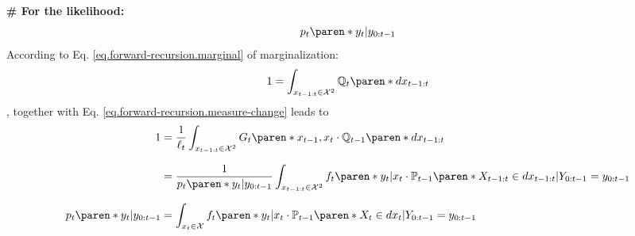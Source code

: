 \textbf{\# For the likelihood:} \label{appendix.sec.bootstrap-likelihood}
%
\begin{equation*}
    p_{t} \paren*{y_{t} \vert y_{0:t-1}}
\end{equation*}
%
According to Eq. \eqref{eq.forward-recursion.marginal} of marginalization:
%
\begin{equation*}
    1 = \int_{x_{t-1:t} \in \mathcal{X}^{2}}
        \mathbb{Q}_{t} \paren*{dx_{t-1:t}}
\end{equation*}
%
, together with Eq. \eqref{eq.forward-recursion.measure-change} leads to
%
\begin{align*}
    1 &=
        \dfrac{1}{\ell_{t}}
        \int_{x_{t-1:t} \in \mathcal{X}^{2}}
        G_{t} \paren*{x_{t-1}, x_{t}} \cdot
        \mathbb{Q}_{t-1} \paren*{dx_{t-1:t}}
    \\[1.5ex]
    &=
        \dfrac{1}{ p_{t} \paren*{ y_{t} \vert y_{0:t-1} } }
        \int_{x_{t-1:t} \in \mathcal{X}^{2}}
        f_{t} \paren*{ y_{t} \vert x_{t} } \cdot
        \mathbb{P}_{t-1} \paren*{ X_{t-1:t} \in dx_{t-1:t} \vert Y_{0:t-1} = y_{0:t-1}}
    \\[1.5ex]
    p_{t} \paren*{ y_{t} \vert y_{0:t-1} } &=
        \int_{x_{t} \in \mathcal{X}}
        f_{t} \paren*{ y_{t} \vert x_{t} } \cdot
        \mathbb{P}_{t-1} \paren*{ X_{t} \in dx_{t} \vert Y_{0:t-1} = y_{0:t-1}}
\end{align*}
